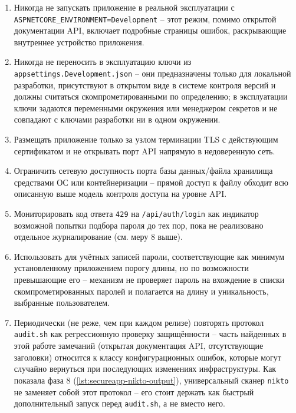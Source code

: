 
\begin{enumerate}
  \item Никогда не запускать приложение в реальной эксплуатации с
  \texttt{ASPNETCORE\_ENVIRONMENT=Development} -- этот режим, помимо
  открытой документации API, включает подробные страницы ошибок,
  раскрывающие внутреннее устройство приложения.
  \item Никогда не переносить в эксплуатацию ключи из
  \texttt{appsettings.Development.json} -- они предназначены только для
  локальной разработки, присутствуют в открытом виде в системе контроля
  версий и должны считаться скомпрометированными по определению; в
  эксплуатации ключи задаются переменными окружения или менеджером
  секретов и не совпадают с ключами разработки ни в одном окружении.
  \item Размещать приложение только за узлом терминации TLS с
  действующим сертификатом и не открывать порт API напрямую в
  недоверенную сеть.
  \item Ограничить сетевую доступность порта базы данных/файла хранилища
  средствами ОС или контейнеризации -- прямой доступ к файлу обходит всю
  описанную выше модель контроля доступа на уровне API.
  \item Мониторировать код ответа \texttt{429} на \texttt{/api/auth/login}
  как индикатор возможной попытки подбора пароля до тех пор, пока не
  реализовано отдельное журналирование (см. меру 8 выше).
  \item Использовать для учётных записей пароли, соответствующие как
  минимум установленному приложением порогу длины, но по возможности
  превышающие его -- механизм не проверяет пароль на вхождение в списки
  скомпрометированных паролей и полагается на длину и уникальность,
  выбранные пользователем.
  \item Периодически (не реже, чем при каждом релизе) повторять протокол
  \texttt{audit.sh} как регрессионную проверку защищённости -- часть
  найденных в этой работе замечаний (открытая документация API,
  отсутствующие заголовки) относится к классу конфигурационных ошибок,
  которые могут случайно вернуться при последующих изменениях
  инфраструктуры. Как показала фаза 8 (\autoref{lst:secureapp-nikto-output}),
  универсальный сканер \texttt{nikto} не заменяет собой этот протокол --
  его стоит держать как быстрый дополнительный запуск перед
  \texttt{audit.sh}, а не вместо него.
\end{enumerate}
